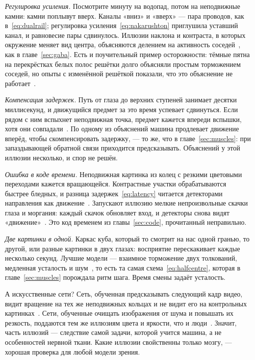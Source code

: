 \emph{Регулировка усиления.} Посмотрите минуту на водопад, потом на неподвижные камни: камни поплывут вверх. Каналы «вниз» и «вверх» --- пара проводов, как в~\eqref{eq:dualrail}; регулировка усиления~\eqref{eq:nakarushton} приглушила уставший канал, и равновесие пары сдвинулось. Иллюзии наклона и контраста, в которых окружение меняет вид центра, объясняются делением на активность соседей~\cite{Schwartz2009}, как в главе~\ref{sec:gaba}. Есть и поучительный пример осторожности: тёмные пятна на перекрёстках белых полос решётки долго объясняли простым торможением соседей, но опыты с изменённой решёткой показали, что это объяснение не работает~\cite{SchillerCarvey2005}.

\emph{Компенсация задержек.} Путь от глаза до верхних ступеней занимает десятки миллисекунд, и движущийся предмет за это время успевает сдвинуться. Если рядом с ним вспыхнет неподвижная точка, предмет кажется впереди вспышки, хотя они совпадали~\cite{Nijhawan1994}. По одному из объяснений машина продлевает движение вперёд, чтобы скомпенсировать задержку, --- то же, что в главе~\ref{sec:muscles}: при запаздывающей обратной связи приходится предсказывать. Объяснений у этой иллюзии несколько, и спор не решён.

\emph{Ошибка в коде времени.} Неподвижная картинка из колец с резкими цветовыми переходами кажется вращающейся. Контрастные участки обрабатываются быстрее бледных, и разница задержек~\eqref{eq:latency} читается детекторами направления как движение~\cite{Conway2005}. Запускают иллюзию мелкие непроизвольные скачки глаза и моргания: каждый скачок обновляет вход, и детекторы снова видят «движение»~\cite{OteroMillan2012}. Это код временем из главы~\ref{sec:code}, прочитанный неправильно.

\emph{Две картинки в одной.} Каркас куба, который то смотрит на нас одной гранью, то другой, или разные картинки в двух глазах: восприятие перескакивает каждые несколько секунд. Лучшие модели --- взаимное торможение двух толкований, медленная усталость и шум~\cite{MorenoBote2007}, то есть та самая схема~\eqref{eq:halfcentre}, которая в главе~\ref{sec:muscles} порождала ритм шага. Время смены задаёт усталость.

А искусственные сети? Сеть, обученная предсказывать следующий кадр видео, видит вращение на тех же неподвижных кольцах и не видит его на контрольных картинках~\cite{Watanabe2018}. Сети, обученные очищать изображения от шума и повышать их резкость, поддаются тем же иллюзиям цвета и яркости, что и люди~\cite{GomezVilla2020}. Значит, часть иллюзий --- следствие самой задачи, которой учится машина, а не особенностей нервной ткани. Какие иллюзии свойственны только мозгу, --- хорошая проверка для любой модели зрения.

